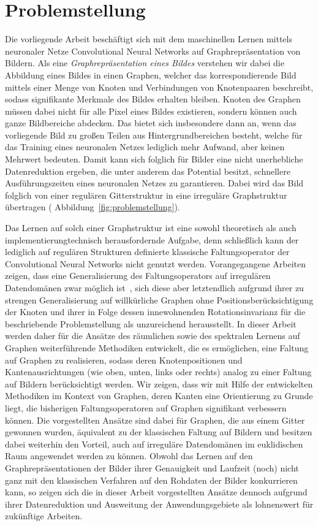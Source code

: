 \section{Problemstellung}
\label{problemstellung}

Die vorliegende Arbeit beschäftigt sich mit dem maschinellen Lernen mittels neuronaler Netze \bzw{} Convolutional Neural Networks auf Graphrepräsentation von Bildern.
Als eine \emph{Graphrepräsentation eines Bildes} verstehen wir dabei die Abbildung eines Bildes in einen Graphen, welcher das korrespondierende Bild mittels einer Menge von Knoten und Verbindungen von Knotenpaaren beschreibt, sodass signifikante Merkmale des Bildes erhalten bleiben.
Knoten des Graphen müssen dabei nicht für alle Pixel eines Bildes existieren, sondern können auch ganze Bildbereiche abdecken.
Das bietet sich insbesondere dann an, wenn das vorliegende Bild zu großen Teilen aus Hintergrundbereichen besteht, welche für das Training eines neuronalen Netzes lediglich mehr Aufwand, aber keinen Mehrwert bedeuten.
Damit kann sich folglich für Bilder eine nicht unerhebliche Datenreduktion ergeben, die unter anderem das Potential besitzt, schnellere Ausführungszeiten eines neuronalen Netzes zu garantieren.
Dabei wird das Bild folglich von einer regulären Gitterstruktur in eine irreguläre Graphstruktur übertragen (\vgl{} Abbildung~\ref{fig:problemstellung}).

Das Lernen auf solch einer Graphstruktur ist eine sowohl theoretisch als auch implementierungtechnisch herausfordernde Aufgabe, denn schließlich kann der lediglich auf regulären Strukturen definierte klassische Faltungsoperator der Convolutional Neural Networks nicht genutzt werden.
Vorangegangene Arbeiten zeigen, dass eine Generalisierung des Faltungsoperators auf irregulären Datendomänen zwar möglich ist~\cite{patchy, Defferrard, gcn}, sich diese aber letztendlich aufgrund ihrer zu strengen Generalisierung auf willkürliche Graphen ohne Positionsberücksichtigung der Knoten und ihrer in Folge dessen innewohnenden Rotationsinvarianz für die beschriebende Problemstellung als unzureichend herausstellt.
In dieser Arbeit werden daher für die Ansätze des räumlichen sowie des spektralen Lernens auf Graphen weiterführende Methodiken entwickelt, die es ermöglichen, eine Faltung auf Graphen zu realisieren, sodass deren Knotenpositionen und Kantenausrichtungen (wie oben, unten, links oder rechts) analog zu einer Faltung auf Bildern berücksichtigt werden.
Wir zeigen, dass wir mit Hilfe der entwickelten Methodiken im Kontext von Graphen, deren Kanten eine Orientierung zu Grunde liegt, die bisherigen Faltungsoperatoren auf Graphen signifikant verbessern können.
Die vorgestellten Ansätze sind dabei für Graphen, die aus einem Gitter gewonnen wurden, äquivalent zu der klassischen Faltung auf Bildern und besitzen dabei weiterhin den Vorteil, auch auf irreguläre Datendomänen im euklidischen Raum angewendet werden zu können.
Obwohl das Lernen auf den Graphrepräsentationen der Bilder \bzgl{} ihrer Genauigkeit und Laufzeit (noch) nicht ganz mit den klassischen Verfahren auf den Rohdaten der Bilder konkurrieren kann, so zeigen sich die in dieser Arbeit vorgestellten Ansätze dennoch aufgrund ihrer Datenreduktion und Ausweitung der Anwendungsgebiete als lohnenswert für zukünftige Arbeiten.
